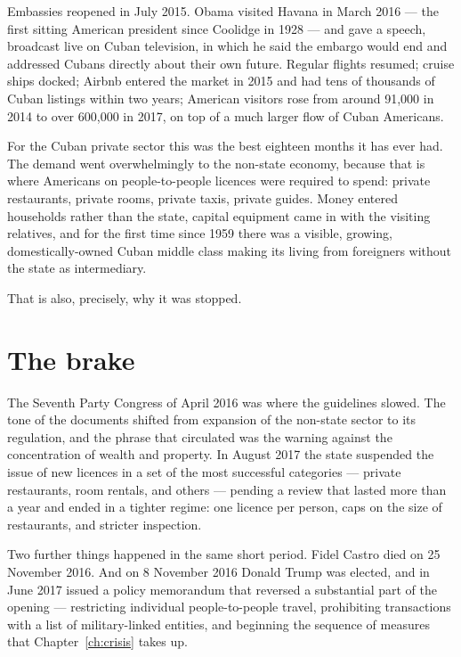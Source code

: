 Embassies reopened in July 2015. Obama visited Havana in March 2016 --- the
first sitting American president since Coolidge in 1928 --- and gave a speech,
broadcast live on Cuban television, in which he said the embargo would end and
addressed Cubans directly about their own future. Regular flights resumed;
cruise ships docked; Airbnb entered the market in 2015 and had tens of thousands
of Cuban listings within two years; American visitors rose from around 91,000 in
2014 to over 600,000 in 2017, on top of a much larger flow of Cuban
Americans.\unv{}

For the Cuban private sector this was the best eighteen months it has ever had.
The demand went overwhelmingly to the non-state economy, because that is where
Americans on people-to-people licences were required to spend: private
restaurants, private rooms, private taxis, private guides. Money entered
households rather than the state, capital equipment came in with the visiting
relatives, and for the first time since 1959 there was a visible, growing,
domestically-owned Cuban middle class making its living from foreigners without
the state as intermediary.

That is also, precisely, why it was stopped.

\section{The brake}

The Seventh Party Congress of April 2016 was where the guidelines slowed. The
tone of the documents shifted from expansion of the non-state sector to its
regulation, and the phrase that circulated was the warning against the
concentration of wealth and property. In August 2017 the state suspended the
issue of new licences in a set of the most successful categories --- private
restaurants, room rentals, and others --- pending a review that lasted more than
a year and ended in a tighter regime: one licence per person, caps on the size
of restaurants, and stricter inspection.

Two further things happened in the same short period. Fidel Castro died on 25
November 2016. And on 8 November 2016 Donald Trump was elected, and in June 2017
issued a policy memorandum that reversed a substantial part of the opening ---
restricting individual people-to-people travel, prohibiting transactions with a
list of military-linked entities, and beginning the sequence of measures that
Chapter~\ref{ch:crisis} takes up.

